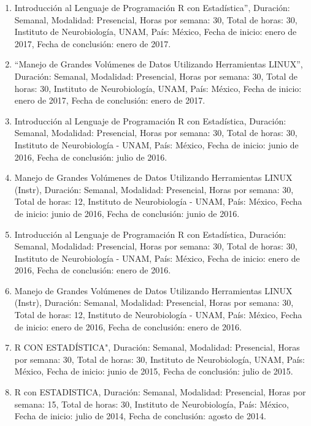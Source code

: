 \begin{enumerate}
\item Introducción al Lenguaje de Programación R con Estadística”, Duración: Semanal, Modalidad: Presencial, Horas por 
semana: 30, Total de horas: 30, Instituto de Neurobiología, UNAM, País: México, Fecha de inicio: enero de 2017, Fecha de 
conclusión: enero de 2017.

\item “Manejo de Grandes Volúmenes de Datos Utilizando Herramientas LINUX”, Duración: Semanal, Modalidad: Presencial, Horas 
por semana: 30, Total de horas: 30, Instituto de Neurobiología, UNAM, País: México, Fecha de inicio: enero de 2017, Fecha 
de conclusión: enero de 2017.

\item Introducción al Lenguaje de Programación R con Estadística, Duración: Semanal, Modalidad: Presencial, Horas por semana: 
30, Total de horas: 30, Instituto de Neurobiología - UNAM, País: México, Fecha de inicio: junio de 2016, Fecha de 
conclusión: julio de 2016.

\item Manejo de Grandes Volúmenes de Datos Utilizando Herramientas LINUX (Instr), Duración: Semanal, Modalidad: Presencial, 
Horas por semana: 30, Total de horas: 12, Instituto de Neurobiología - UNAM, País: México, Fecha de inicio: junio de 2016, 
Fecha de conclusión: junio de 2016.

\item Introducción al Lenguaje de Programación R con Estadística, Duración: Semanal, Modalidad: Presencial, Horas por semana: 
30, Total de horas: 30, Instituto de Neurobiología - UNAM, País: México, Fecha de inicio: enero de 2016, Fecha de 
conclusión: enero de 2016.

\item Manejo de Grandes Volúmenes de Datos Utilizando Herramientas LINUX (Instr), Duración: Semanal, Modalidad: Presencial, 
Horas por semana: 30, Total de horas: 12, Instituto de Neurobiología - UNAM, País: México, Fecha de inicio: enero de 2016, 
Fecha de conclusión: enero de 2016.

\item R CON ESTADÍSTICA", Duración: Semanal, Modalidad: Presencial, Horas por semana: 30, Total de horas: 30, Instituto de 
Neurobiología, UNAM, País: México, Fecha de inicio: junio de 2015, Fecha de conclusión: julio de 2015.

\item R con ESTADISTICA, Duración: Semanal, Modalidad: Presencial, Horas por semana: 15, Total de horas: 30, Instituto de 
Neurobiología, País: México, Fecha de inicio: julio de 2014, Fecha de conclusión: agosto de 2014.


\end{enumerate}
